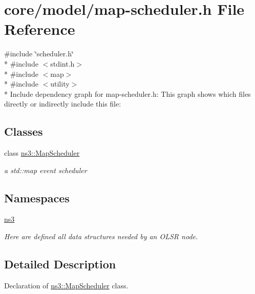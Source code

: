 \hypertarget{map-scheduler_8h}{}\section{core/model/map-\/scheduler.h File Reference}
\label{map-scheduler_8h}
{\ttfamily \#include \char`\"{}scheduler.\+h\char`\"{}}\\*
{\ttfamily \#include $<$stdint.\+h$>$}\\*
{\ttfamily \#include $<$map$>$}\\*
{\ttfamily \#include $<$utility$>$}\\*
Include dependency graph for map-\/scheduler.h\+:
This graph shows which files directly or indirectly include this file\+:
\subsection*{Classes}
\begin{DoxyCompactItemize}
\item 
class \hyperlink{classns3_1_1MapScheduler}{ns3\+::\+Map\+Scheduler}
\begin{DoxyCompactList}\small\item\em a std\+::map event scheduler \end{DoxyCompactList}\end{DoxyCompactItemize}
\subsection*{Namespaces}
\begin{DoxyCompactItemize}
\item 
 \hyperlink{namespacens3}{ns3}
\begin{DoxyCompactList}\small\item\em Here are defined all data structures needed by an O\+L\+SR node. \end{DoxyCompactList}\end{DoxyCompactItemize}


\subsection{Detailed Description}
Declaration of \hyperlink{classns3_1_1MapScheduler}{ns3\+::\+Map\+Scheduler} class. 